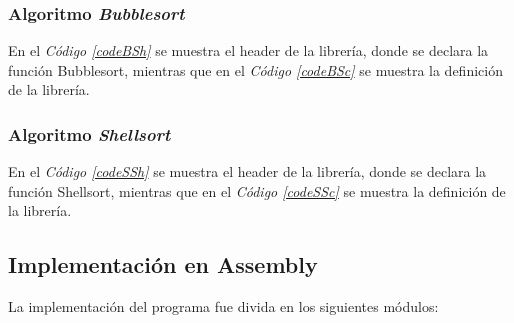 \documentclass{article}
\newcommand{\refcode}[1]{\textit{Código \ref{#1}}}
\begin{document}
\subsubsection{Algoritmo \textit{Bubblesort}}

	En el \refcode{codeBSh} se muestra el header de la librería, donde se declara la función Bubblesort, mientras que en el \refcode{codeBSc} se muestra la definición de la librería.

%  


%  




\subsubsection{Algoritmo \textit{Shellsort}}

	En el \refcode{codeSSh} se muestra el header de la librería, donde se declara la función Shellsort, mientras que en el \refcode{codeSSc} se muestra la definición de la librería.

%  


%  
\bigskip\bigskip




\newpage
\subsection{Implementación en Assembly}

	La implementación del programa fue divida en los siguientes módulos:
	\medskip
\end{document}
